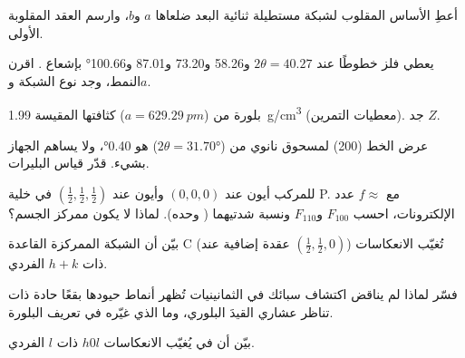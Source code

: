 \begin{exercise}[$\star$]\label{exo:b3:x-ray-diffraction:4}
أعطِ الأساس المقلوب لشبكة مستطيلة ثنائية البعد ضلعاها
$a$ و$b$، وارسم العقد المقلوبة الأولى.
\end{exercise}

\begin{exercise}[$\star\star$]\label{exo:b3:x-ray-diffraction:5}
يعطي فلز خطوطًا عند $2\theta = 40.27$ و58.26 و73.20 و87.01 و\ang{100.66} بإشعاع . اقرن النمط، وجد نوع الشبكة و$a$.
\end{exercise}

\begin{exercise}[$\star\star$]\label{exo:b3:x-ray-diffraction:6}
بلورة من  ($a = \qty{629.29}{pm}$) كثافتها المقيسة
\qty{1.99}{g/cm^3} (معطيات التمرين). جد $Z$.
\end{exercise}

\begin{exercise}[$\star\star$]\label{exo:b3:x-ray-diffraction:7}
عرض الخط (200) لمسحوق نانوي من  ($2\theta = \ang{31.70}$) هو \ang{0.40}،
ولا يساهم الجهاز بشيء. قدّر قياس البليرات.
\end{exercise}

\begin{exercise}[$\star\star$]\label{exo:b3:x-ray-diffraction:8}
للمركب  أيون  عند $(0,0,0)$ وأيون  عند $(\frac12,\frac12,\frac12)$ في خلية P. مع $f
\approx$ عدد الإلكترونات، احسب $F_{100}$ و$F_{110}$ ونسبة
شدتيهما ( وحده). لماذا لا يكون  ممركز الجسم؟
\end{exercise}

\begin{exercise}[$\star\star$]\label{exo:b3:x-ray-diffraction:9}
بيّن أن الشبكة الممركزة القاعدة C (عقدة إضافية عند $(\frac12,\frac12,0)$) تُغيّب
الانعكاسات ذات $h + k$ الفردي.
\end{exercise}

\begin{exercise}[$\star\star\star$]\label{exo:b3:x-ray-diffraction:10}
فسّر لماذا لم يناقض اكتشاف سبائك في الثمانينيات تُظهر أنماط حيودها بقعًا حادة
ذات تناظر عشاري القيدَ البلوري، وما الذي
غيّره في تعريف البلورة.
\end{exercise}

\begin{exercise}[$\star\star\star$]\label{exo:b3:x-ray-diffraction:11}
بيّن أن  في  يُغيّب الانعكاسات $h0l$ ذات $l$
الفردي.
\end{exercise}

